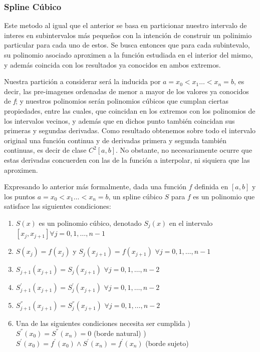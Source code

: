 \subsubsection{Spline Cúbico}

Este metodo al igual que el anterior se basa en particionar nuestro intervalo de interes en subintervalos más pequeños con la intención de construir un polinimio particular para cada uno de estos. Se busca entonces que para cada subintevalo, su polinomio asociado aproximen a la función estudiada en el interior del mismo, y además coincida con los resultados ya conocidos en ambos extremos. 

Nuestra partición a considerar será la inducida por $a = x_0 < x_1 \dots < x_n = b$, es decir, las pre-imagenes ordenadas de menor a mayor de los valores ya conocidos de \textit{f}; y nuestros polinomios serán polinomios cúbicos que cumplan ciertas propiedades, entre las cuales, que coincidan en los extremos con los polinomios de los intervalos vecinos, y además que en dichos punto también coincidan sus primeras y segundas derivadas. Como resultado obtenemos sobre todo el intervalo original una función continua y de derivadas primera y segunda también continuas, es decir de clase $C^{2}[a, b]$. No obstante, no necesariamente ocurre que estas derivadas concuerden con las de la función a interpolar, ni siquiera que las aproximen.


Expresando lo anterior más formalmente, dada una función $f$ definida en $[a, b]$ y los puntos $a = x_0 < x_1 \dots < x_n = b$, un spline cúbico $S$ para $f$ es un polinomio que satisface las siguientes condiciones:

\begin{enumerate}
\item $S(x)$ es un polinomio cúbico, denotado $S_j(x)$ en el intervalo $[x_j, x_{j+1}] \forall j = 0, 1, \dots, n-1$ \label{eq:s1}
\item $S(x_j) = f(x_j)$ y $S_j(x_{j+1}) = f(x_{j+1})$ $\forall j = 0, 1, \dots, n-1$ \label{eq:s2}
\item $S_{j+1}(x_{j+1}) = S_j(x_{j+1})$ $\forall j = 0, 1, \dots, n-2$ \label{eq:s3}
\item $S_{j+1}^{'}(x_{j+1}) = S_j^{'}(x_{j+1})$ $\forall j = 0, 1, \dots, n-2$ \label{eq:s4}
\item $S_{j+1}^{''}(x_{j+1}) = S_j^{''}(x_{j+1})$ $\forall j = 0, 1, \dots, n-2$ \label{eq:s5}
\item Una de las siguientes condiciones necesita ser cumplida \label{eq:s6}
) $S^{''}(x_0) = S^{''}(x_n) = 0$ (borde natural) 
) $S^{'}(x_0) =  f^{'}(x_0) \wedge S^{'}(x_n) = f^{'}(x_n)$ (borde sujeto) 
\end{enumerate}

